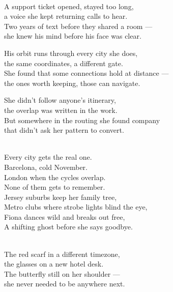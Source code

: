 \begin{lyrics}
\\
A support ticket opened, stayed too long,\\
a voice she kept returning calls to hear.\\
Two years of text before they shared a room —\\
she knew his mind before his face was clear.

His orbit runs through every city she does,\\
the same coordinates, a different gate.\\
She found that some connections hold at distance —\\
the ones worth keeping, those can navigate.

She didn't follow anyone's itinerary,\\
the overlap was written in the work.\\
But somewhere in the routing she found company\\
that didn't ask her pattern to convert.

\\
Every city gets the real one.\\
Barcelona, cold November.\\
London when the cycles overlap.\\
None of them gets to remember.\\
Jersey suburbs keep her family tree,\\
Metro clubs where strobe lights blind the eye,\\
Fiona dances wild and breaks out free,\\
A shifting ghost before she says goodbye.

\\
The red scarf in a different timezone,\\
the glasses on a new hotel desk.\\
The butterfly still on her shoulder —\\
she never needed to be anywhere next.


\end{lyrics}


